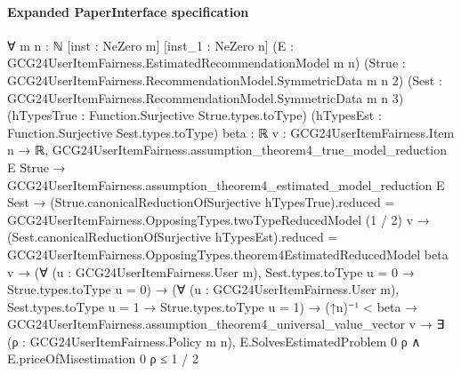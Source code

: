 \documentclass[10pt]{article}
\begin{document}
\paragraph{Expanded PaperInterface specification}
\begin{ReviewVerbatim}
∀ {m n : ℕ} [inst : NeZero m] [inst_1 : NeZero n] (E : GCG24UserItemFairness.EstimatedRecommendationModel m n)
  (Strue : GCG24UserItemFairness.RecommendationModel.SymmetricData m n 2)
  (Sest : GCG24UserItemFairness.RecommendationModel.SymmetricData m n 3)
  (hTypesTrue : Function.Surjective Strue.types.toType) (hTypesEst : Function.Surjective Sest.types.toType) {beta : ℝ}
  {v : GCG24UserItemFairness.Item n → ℝ},
  GCG24UserItemFairness.assumption_theorem4_true_model_reduction E Strue →
    GCG24UserItemFairness.assumption_theorem4_estimated_model_reduction E Sest →
      (Strue.canonicalReductionOfSurjective hTypesTrue).reduced =
          GCG24UserItemFairness.OpposingTypes.twoTypeReducedModel (1 / 2) v →
        (Sest.canonicalReductionOfSurjective hTypesEst).reduced =
            GCG24UserItemFairness.OpposingTypes.theorem4EstimatedReducedModel beta v →
          (∀ (u : GCG24UserItemFairness.User m), Sest.types.toType u = 0 → Strue.types.toType u = 0) →
            (∀ (u : GCG24UserItemFairness.User m), Sest.types.toType u = 1 → Strue.types.toType u = 1) →
              (↑n)⁻¹ < beta →
                GCG24UserItemFairness.assumption_theorem4_universal_value_vector v →
                  ∃ (ρ : GCG24UserItemFairness.Policy m n),
                    E.SolvesEstimatedProblem 0 ρ ∧ E.priceOfMisestimation 0 ρ ≤ 1 / 2
\end{ReviewVerbatim}
\end{document}
